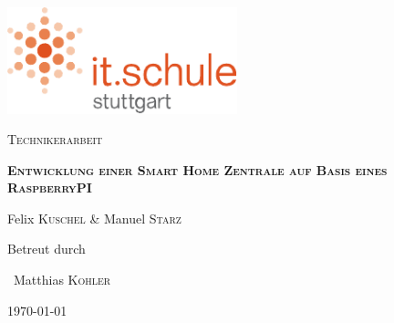 \begin{titlepage}
	\centering
	\includegraphics[width=0.5\textwidth]{pdf/its_logo.pdf}\par\vspace{1cm}
	\vspace{1cm}
	{\scshape\Large Technikerarbeit\par}
	\vspace{1.5cm}
	{\huge\bfseries\scshape Entwicklung einer Smart Home Zentrale auf Basis eines RaspberryPI\par}
	\vspace{2cm}
	{\Large Felix \textsc{Kuschel} \& Manuel \textsc{Starz}\par}
	\vfill
	Betreut durch\par
	~Matthias \textsc{Kohler}

	\vfill

	{\large \today\par}
\end{titlepage}
